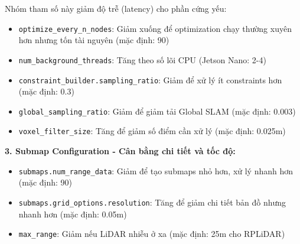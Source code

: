 Nhóm tham số này giảm độ trễ (latency) cho phần cứng yếu:

\begin{itemize}
    \item \texttt{optimize\_every\_n\_nodes}: Giảm xuống để optimization chạy thường xuyên hơn nhưng tốn tài nguyên (mặc định: 90)

    \item \texttt{num\_background\_threads}: Tăng theo số lõi CPU (Jetson Nano: 2-4)

    \item \texttt{constraint\_builder.sampling\_ratio}: Giảm để xử lý ít constraints hơn (mặc định: 0.3)

    \item \texttt{global\_sampling\_ratio}: Giảm để giảm tải Global SLAM (mặc định: 0.003)

    \item \texttt{voxel\_filter\_size}: Tăng để giảm số điểm cần xử lý (mặc định: 0.025m)
\end{itemize}

\textbf{3. Submap Configuration - Cân bằng chi tiết và tốc độ:}

\begin{itemize}
    \item \texttt{submaps.num\_range\_data}: Giảm để tạo submaps nhỏ hơn, xử lý nhanh hơn (mặc định: 90)

    \item \texttt{submaps.grid\_options.resolution}: Tăng để giảm chi tiết bản đồ nhưng nhanh hơn (mặc định: 0.05m)

    \item \texttt{max\_range}: Giảm nếu LiDAR nhiễu ở xa (mặc định: 25m cho RPLiDAR)
\end{itemize}
\vspace{1cm}